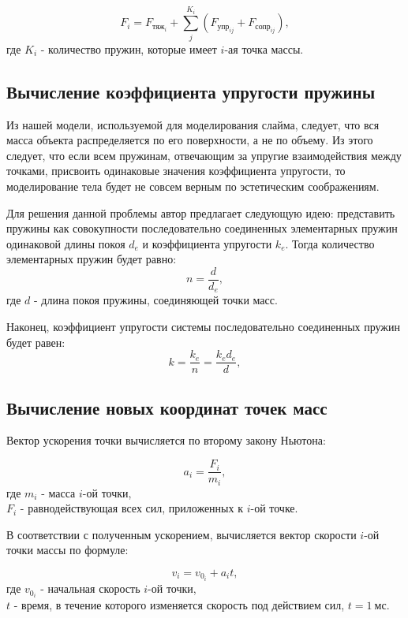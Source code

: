 \begin{equation}\label{f}
	F_i = F_{\text{тяж}_i} + \sum_{j}^{K_i} (F_{\text{упр}_{ij}} + F_{\text{сопр}_{ij}}),
\end{equation}
где $K_i$ - количество пружин, которые имеет $i$-ая точка массы.

\subsection{Вычисление коэффициента упругости пружины}

Из нашей модели, используемой для моделирования слайма, следует, что вся масса объекта распределяется по его поверхности, а не по объему. Из этого следует, что если всем пружинам, отвечающим за упругие взаимодействия между точками, присвоить одинаковые значения коэффициента упругости, то моделирование тела будет не совсем верным по эстетическим соображениям.

Для решения данной проблемы автор предлагает следующую идею: представить пружины как совокупности последовательно соединенных элементарных пружин одинаковой длины покоя $d_e$ и коэффициента упругости $k_e$. Тогда количество элементарных пружин будет равно:
\begin{equation}\label{stifn}
	n = \frac{d}{d_e},
\end{equation}
где $d$ - длина покоя пружины, соединяющей точки масс.

Наконец, коэффициент упругости системы последовательно соединенных пружин будет равен:
\begin{equation}\label{stif}
	k = \frac{k_e}{n} = \frac{k_e d_e}{d},
\end{equation}

\subsection{Вычисление новых координат точек масс}

Вектор ускорения точки вычисляется по второму закону Ньютона:

\begin{equation}\label{sln}
	a_i = \frac{F_i}{m_i},
\end{equation}
где $m_i$ - масса $i$-ой точки,\\
\text{~~~~~~}$F_i$ - равнодействующая всех сил, приложенных к $i$-ой точке.

В соответствии с полученным ускорением, вычисляется вектор скорости $i$-ой точки массы по формуле:

\begin{equation}\label{velocity}
	v_i = v_{0_i} + a_i t,
\end{equation}
где $v_{0_i}$ - начальная скорость $i$-ой точки,\\
\text{~~~~~~}$t$ - время, в течение которого изменяется скорость под действием сил, $t = 1~\text{мс}$.

